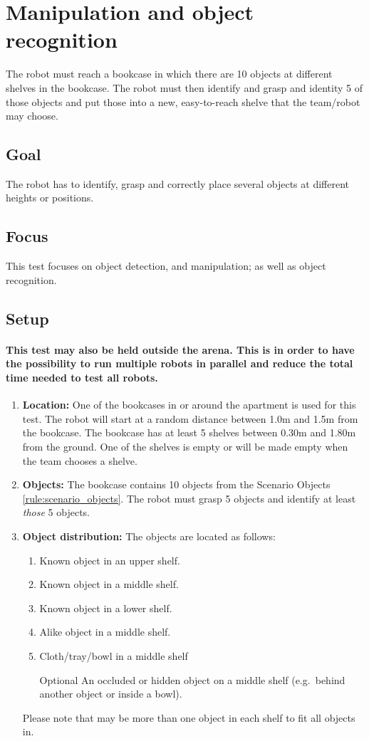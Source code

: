 \section{Manipulation and object recognition}

The robot must reach a bookcase in which there are 10 objects at different shelves in the bookcase. 
The robot must then identify and grasp and identity 5 of those objects and put those into a new, easy-to-reach shelve that the team/robot may choose.

\subsection{Goal}
The robot has to identify, grasp and correctly place several objects at different heights or positions.

\subsection{Focus}
This test focuses on object detection, and manipulation; as well as object recognition.

\subsection{Setup}
\paragraph{This test may also be held outside the arena.
  This is in order to have the possibility to run multiple robots in parallel and reduce the total time needed to test all robots.}

\begin{enumerate}
\item \textbf{Location:} One of the bookcases in or around the apartment is used for this test. The robot will start at a random distance between 1.0m and 1.5m from the bookcase.
The bookcase has at least 5 shelves between 0.30m and 1.80m from the ground. One of the shelves is empty or will be made empty when the team chooses a shelve.
\item \textbf{Objects:} The bookcase contains 10 objects from the Scenario Objects \ref{rule:scenario_objects}.
  The robot must grasp 5 objects and identify at least \emph{those} 5 objects. 
\item \textbf{Object distribution:} The objects are located as follows:
\begin{enumerate}
\item Known object in an upper shelf.
\item Known object in a middle shelf.
\item Known object in a lower shelf.
\item Alike object in a middle shelf.
\item Cloth/tray/bowl in a middle shelf
\item[Optional] An occluded or hidden object on a middle shelf (e.g.~behind another object or inside a bowl).
\end{enumerate}
Please note that may be more than one object in each shelf to fit all objects in.
\end{enumerate}

